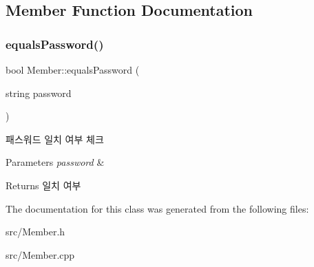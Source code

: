 \subsection{Member Function Documentation}
\mbox{\label{class_member_a9fe3103fb15b00e6a51194d57f6c4148}} 
\subsubsection{\texorpdfstring{equals\+Password()}{equalsPassword()}}
{\footnotesize\ttfamily bool Member\+::equals\+Password (\begin{DoxyParamCaption}\item[{string}]{password }\end{DoxyParamCaption})}

패스워드 일치 여부 체크 
\begin{DoxyParams}{Parameters}
{\em password} & \\
\hline
\end{DoxyParams}
\begin{DoxyReturn}{Returns}
일치 여부 
\end{DoxyReturn}


The documentation for this class was generated from the following files\+:\begin{DoxyCompactItemize}
\item 
src/Member.\+h\item 
src/Member.\+cpp\end{DoxyCompactItemize}
